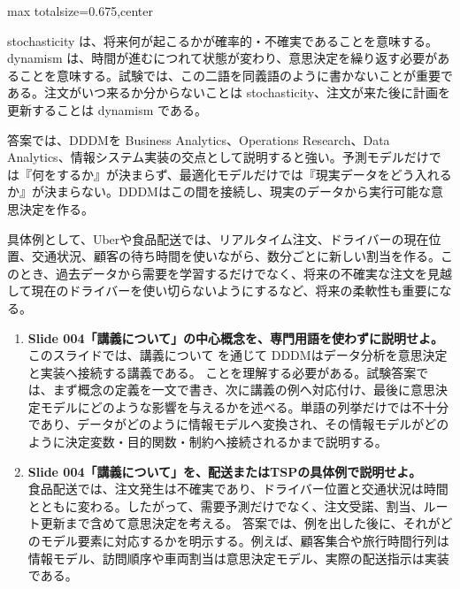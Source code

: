 \begin{adjustbox}{max totalsize={\textwidth}{0.675\textheight},center}
\begin{minipage}{\textwidth}
\begin{minipage}[t]{0.485\textwidth}
stochasticity は、将来何が起こるかが確率的・不確実であることを意味する。dynamism は、時間が進むにつれて状態が変わり、意思決定を繰り返す必要があることを意味する。試験では、この二語を同義語のように書かないことが重要である。注文がいつ来るか分からないことは stochasticity、注文が来た後に計画を更新することは dynamism である。\par
答案では、DDDMを Business Analytics、Operations Research、Data Analytics、情報システム実装の交点として説明すると強い。予測モデルだけでは『何をするか』が決まらず、最適化モデルだけでは『現実データをどう入れるか』が決まらない。DDDMはこの間を接続し、現実のデータから実行可能な意思決定を作る。\par
具体例として、Uberや食品配送では、リアルタイム注文、ドライバーの現在位置、交通状況、顧客の待ち時間を使いながら、数分ごとに新しい割当を作る。このとき、過去データから需要を学習するだけでなく、将来の不確実な注文を見越して現在のドライバーを使い切らないようにするなど、将来の柔軟性も重要になる。\par
{}
\begin{enumerate}
\item \textbf{Slide 004「講義について」の中心概念を、専門用語を使わずに説明せよ。}\\このスライドでは、講義について を通じて DDDMはデータ分析を意思決定と実装へ接続する講義である。 ことを理解する必要がある。試験答案では、まず概念の定義を一文で書き、次に講義の例へ対応付け、最後に意思決定モデルにどのような影響を与えるかを述べる。単語の列挙だけでは不十分であり、データがどのように情報モデルへ変換され、その情報モデルがどのように決定変数・目的関数・制約へ接続されるかまで説明する。
\item \textbf{Slide 004「講義について」を、配送またはTSPの具体例で説明せよ。}\\食品配送では、注文発生は不確実であり、ドライバー位置と交通状況は時間とともに変わる。したがって、需要予測だけでなく、注文受諾、割当、ルート更新まで含めて意思決定を考える。 答案では、例を出した後に、それがどのモデル要素に対応するかを明示する。例えば、顧客集合や旅行時間行列は情報モデル、訪問順序や車両割当は意思決定モデル、実際の配送指示は実装である。
\end{enumerate}
\end{minipage}
\end{minipage}
\end{adjustbox}


